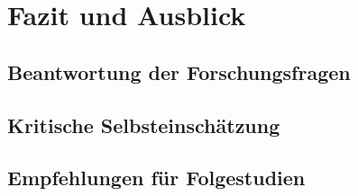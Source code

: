\chapter{Fazit und Ausblick}
\section{Beantwortung der Forschungsfragen}
\section{Kritische Selbsteinschätzung}
\section{Empfehlungen für Folgestudien}